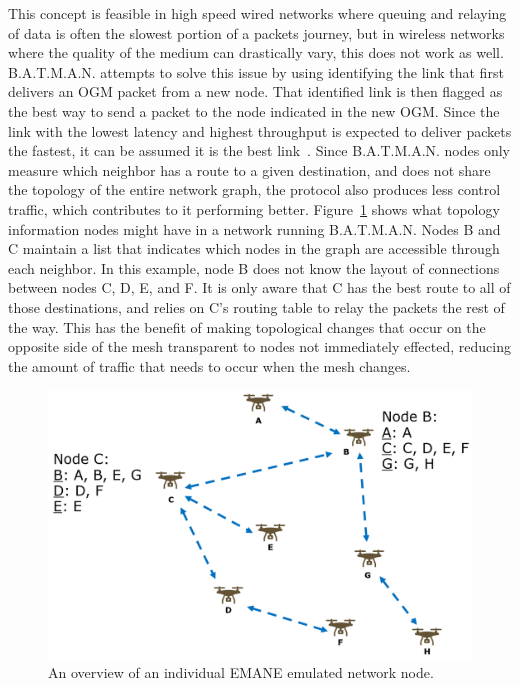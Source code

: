 This concept is feasible in high speed wired networks where queuing and relaying of data is often the slowest portion of a packets journey, but in wireless networks where the quality of the medium can drastically vary, this does not work as well.
B.A.T.M.A.N. attempts to solve this issue by using identifying the link that first delivers an OGM packet from a new node.
That identified link is then flagged as the best way to send a packet to the node indicated in the new OGM.
Since the link with the lowest latency and highest throughput is expected to deliver packets the fastest, it can be assumed it is the best link~\cite{batman}.
Since B.A.T.M.A.N. nodes only measure which neighbor has a route to a given destination, and does not share the topology of the entire network graph, the protocol also produces less control traffic, which contributes to it performing better.
Figure~\ref{batman_topology} shows what topology information nodes might have in a network running B.A.T.M.A.N.
Nodes B and C maintain a list that indicates which nodes in the graph are accessible through each neighbor. In this example, node B does not know the layout of connections between nodes C, D, E, and F.
It is only aware that C has the best route to all of those destinations, and relies on C's routing table to relay the packets the rest of the way.
This has the benefit of making topological changes that occur on the opposite side of the mesh transparent to nodes not immediately effected, reducing the amount of traffic that needs to occur when the mesh changes.

\begin{figure}[!ht]
    \centering
    \includegraphics[width=\textwidth,keepaspectratio]{Images/Chpt2/BATMAN_topology.png}
    \caption{An overview of an individual EMANE emulated network node.}
    \label{batman_topology}
\end{figure}

